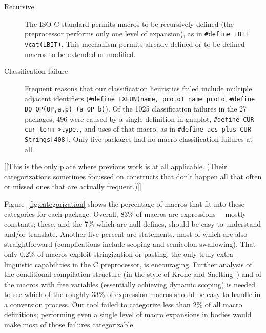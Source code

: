 \documentclass[11pt]{article}
\def\numpackages{27}
\begin{document}
\begin{description}
\item[Recursive]  The ISO C standard permits macros to be recursively
  defined (the preprocessor performs only one level of expansion), as in
  {\tt \#define LBIT vcat(LBIT)}.  This mechanism permits already-defined
  or to-be-defined macros to be extended or modified.

\item[Classification failure]  Frequent reasons that our
  classification heuristics failed include multiple adjacent identifiers
  ({\tt \#define EXFUN(name, proto) name proto}, {\tt \#define
  \verb|DO_OP|(OP,a,b) (a OP b)}).  Of the 1025 classification failures in
the {\numpackages} packages, 496 were caused by a single definition in
gnuplot, {\tt \#define CUR \verb|cur_term->type.|}, and uses of that macro,
as in {\tt \#define \verb|acs_plus| CUR Strings[408]}.  Only five packages
had no macro classification failures at all.



\end{description}

[[This is the only place where previous work is at all applicable.
(Their categorizations sometimes focussed on constructs that don't happen
all that often or missed ones that are actually frequent.)]]


Figure~\ref{fig:categorization} shows the percentage of macros that fit
into these categories for each package.  Overall, 83\% of macros are
expressions\,---\,mostly constants; these, and the 7\% which are null
defines, should be easy to understand and/or translate.  Another five
percent are statements, most of which are also straightforward
(complications include scoping and semicolon swallowing).  That only 0.2\%
of macros exploit stringization or pasting, the only truly extra-linguistic
capabilities in the C preprocessor, is encouraging.  Further analysis of
the conditional compilation structure (in the style of Krone and
Snelting~\cite{Krone94}) and of the macros with free variables (essentially
achieving dynamic scoping) is needed to see which of the roughly 33\% of
expression macros should be easy to handle in a conversion process.  Our
tool failed to categorize less than 2\% of all macro definitions;
performing even a single level of macro expansions in bodies would make
most of those failures categorizable.
\end{document}
